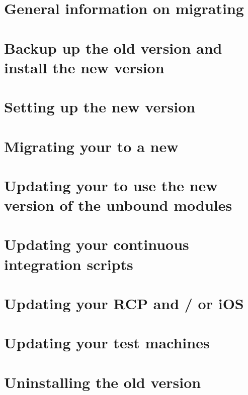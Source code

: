 \section{General information on migrating}


\section{Backup up the old version and install the new version}


\section{Setting up the new version}


\section{Migrating your \gdprojects{} to a new \gddb{}}


\section{Updating your \gdprojects{} to use the new version of the unbound modules}


\section{Updating your continuous integration scripts}


\section{Updating your RCP and / or iOS \gdauts{}}


\section{Updating your test machines}


\section{Uninstalling the old version}

